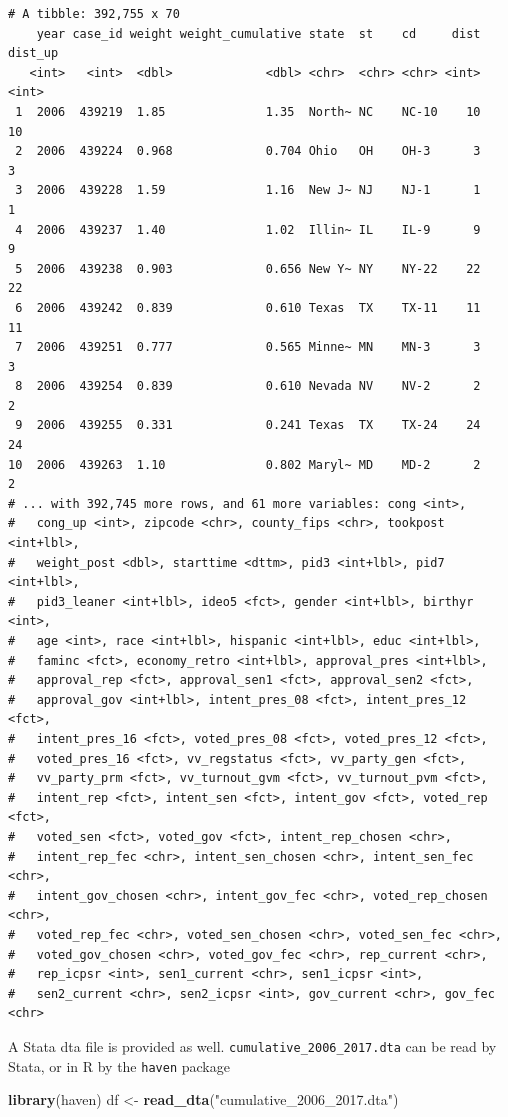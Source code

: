 \documentclass[10pt,article,oneside]{memoir}
\theoremstyle{definition}
\newenvironment{Shaded}{\begin{snugshade}}{\end{snugshade}}
\newcommand{\KeywordTok}[1]{\textcolor[rgb]{0.13,0.29,0.53}{\textbf{#1}}}
\newcommand{\StringTok}[1]{\textcolor[rgb]{0.31,0.60,0.02}{#1}}
\newcommand{\NormalTok}[1]{#1}
\begin{document}
\begin{verbatim}
# A tibble: 392,755 x 70
    year case_id weight weight_cumulative state  st    cd     dist dist_up
   <int>   <int>  <dbl>             <dbl> <chr>  <chr> <chr> <int>   <int>
 1  2006  439219  1.85              1.35  North~ NC    NC-10    10      10
 2  2006  439224  0.968             0.704 Ohio   OH    OH-3      3       3
 3  2006  439228  1.59              1.16  New J~ NJ    NJ-1      1       1
 4  2006  439237  1.40              1.02  Illin~ IL    IL-9      9       9
 5  2006  439238  0.903             0.656 New Y~ NY    NY-22    22      22
 6  2006  439242  0.839             0.610 Texas  TX    TX-11    11      11
 7  2006  439251  0.777             0.565 Minne~ MN    MN-3      3       3
 8  2006  439254  0.839             0.610 Nevada NV    NV-2      2       2
 9  2006  439255  0.331             0.241 Texas  TX    TX-24    24      24
10  2006  439263  1.10              0.802 Maryl~ MD    MD-2      2       2
# ... with 392,745 more rows, and 61 more variables: cong <int>,
#   cong_up <int>, zipcode <chr>, county_fips <chr>, tookpost <int+lbl>,
#   weight_post <dbl>, starttime <dttm>, pid3 <int+lbl>, pid7 <int+lbl>,
#   pid3_leaner <int+lbl>, ideo5 <fct>, gender <int+lbl>, birthyr <int>,
#   age <int>, race <int+lbl>, hispanic <int+lbl>, educ <int+lbl>,
#   faminc <fct>, economy_retro <int+lbl>, approval_pres <int+lbl>,
#   approval_rep <fct>, approval_sen1 <fct>, approval_sen2 <fct>,
#   approval_gov <int+lbl>, intent_pres_08 <fct>, intent_pres_12 <fct>,
#   intent_pres_16 <fct>, voted_pres_08 <fct>, voted_pres_12 <fct>,
#   voted_pres_16 <fct>, vv_regstatus <fct>, vv_party_gen <fct>,
#   vv_party_prm <fct>, vv_turnout_gvm <fct>, vv_turnout_pvm <fct>,
#   intent_rep <fct>, intent_sen <fct>, intent_gov <fct>, voted_rep <fct>,
#   voted_sen <fct>, voted_gov <fct>, intent_rep_chosen <chr>,
#   intent_rep_fec <chr>, intent_sen_chosen <chr>, intent_sen_fec <chr>,
#   intent_gov_chosen <chr>, intent_gov_fec <chr>, voted_rep_chosen <chr>,
#   voted_rep_fec <chr>, voted_sen_chosen <chr>, voted_sen_fec <chr>,
#   voted_gov_chosen <chr>, voted_gov_fec <chr>, rep_current <chr>,
#   rep_icpsr <int>, sen1_current <chr>, sen1_icpsr <int>,
#   sen2_current <chr>, sen2_icpsr <int>, gov_current <chr>, gov_fec <chr>
\end{verbatim}

A Stata dta file is provided as well.
\texttt{cumulative\_2006\_2017.dta} can be read by Stata, or in R by the
\texttt{haven} package

\begin{Shaded}
\begin{Highlighting}[]
\KeywordTok{library}\NormalTok{(haven)}
\NormalTok{df <-}\StringTok{ }\KeywordTok{read_dta}\NormalTok{(}\StringTok{"cumulative_2006_2017.dta"}\NormalTok{)}
\end{Highlighting}
\end{Shaded}
\end{document}
